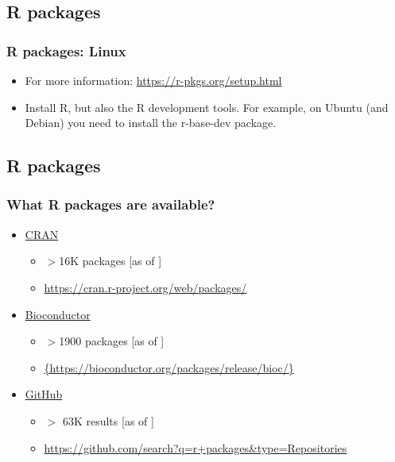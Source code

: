 \documentclass[11pt]{beamer}
\newcommand{\docYear}{\text{2022}} %
\begin{document}
\subsection{R packages}
\begin{frame}
\frametitle{{\sf R} packages: Linux}
\begin{itemize}
\item For more information: \url{https://r-pkgs.org/setup.html}
\vspace{0.2in}
\item Install {\sf R}, but also the {\sf R}  development tools. For example, on Ubuntu (and Debian) you need to install the r-base-dev package.
\end{itemize}
\end{frame}

\subsection{R packages}
\begin{frame}
\frametitle{What {\sf R} packages are available?}
\begin{itemize}
\item \href{https://cran.r-project.org/web/packages/}{CRAN}
\begin{itemize}
\item $>$16K packages [as of \docYear] 
\item \url{https://cran.r-project.org/web/packages/}
\end{itemize}
\vspace{0.2in}
\item \href{https://bioconductor.org/packages/release/bioc/}{Bioconductor}
\begin{itemize}
\item $>$1900 packages [as of \docYear] 
\item \url{{https://bioconductor.org/packages/release/bioc/}}
\end{itemize}
\vspace{0.2in}
\item \href{https://github.com/search?q=r+packages&type=Repositories}{GitHub}
\begin{itemize}
\item $>$ 63K results [as of \docYear] 
\item \url{https://github.com/search?q=r+packages&type=Repositories}
\end{itemize}
\end{itemize}
\end{frame}
\end{document}
